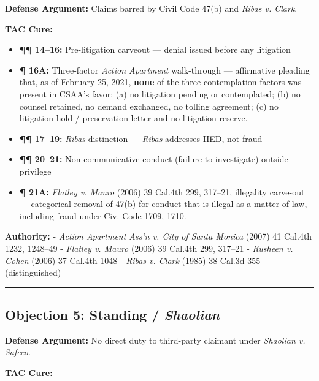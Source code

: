 \textbf{Defense Argument:} Claims barred by Civil Code \textsection{} 47(b) and \emph{Ribas v. Clark}.

\textbf{TAC Cure:}

\begin{itemize}
\tightlist
\item
  \textbf{¶¶ 14--16:} Pre-litigation carveout --- denial issued before any litigation
\item
  \textbf{¶ 16A:} Three-factor \emph{Action Apartment} walk-through --- affirmative pleading that, as of February 25, 2021, \textbf{none} of the three contemplation factors was present in CSAA's favor: (a) no litigation pending or contemplated; (b) no counsel retained, no demand exchanged, no tolling agreement; (c) no litigation-hold / preservation letter and no litigation reserve.
\item
  \textbf{¶¶ 17--19:} \emph{Ribas} distinction --- \emph{Ribas} addresses IIED, not fraud
\item
  \textbf{¶¶ 20--21:} Non-communicative conduct (failure to investigate) outside privilege
\item
  \textbf{¶ 21A:} \emph{Flatley v. Mauro} (2006) 39 Cal.4th 299, 317--21, illegality carve-out --- categorical removal of \textsection{} 47(b) for conduct that is illegal as a matter of law, including fraud under Civ. Code \textsection{}\textsection{} 1709, 1710.
\end{itemize}

\textbf{Authority:} - \emph{Action Apartment Ass'n v. City of Santa Monica} (2007) 41 Cal.4th 1232, 1248--49 - \emph{Flatley v. Mauro} (2006) 39 Cal.4th 299, 317--21 - \emph{Rusheen v. Cohen} (2006) 37 Cal.4th 1048 - \emph{Ribas v. Clark} (1985) 38 Cal.3d 355 (distinguished)

\begin{center}\rule{0.5\linewidth}{0.5pt}\end{center}

\subsection{\texorpdfstring{Objection 5: Standing / \emph{Shaolian}}{Objection 5: Standing / Shaolian}}\label{objection-5-standing-shaolian}

\textbf{Defense Argument:} No direct duty to third-party claimant under \emph{Shaolian v. Safeco}.

\textbf{TAC Cure:}

